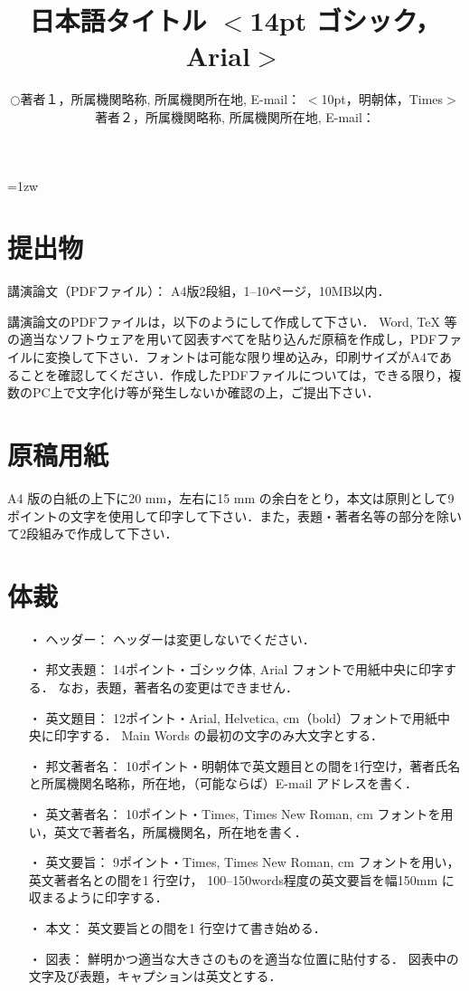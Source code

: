 \documentclass[a4j]{jarticle}
\title{日本語タイトル $<$14pt ゴシック，Arial$>$}   %
\author{\begin{tabular}{cl}
$\bigcirc$ & 著者１，所属機関略称, 
             所属機関所在地, 
             E-mail：
             $<$10pt，明朝体，Times$>$ \\
           & 著者２，所属機関略称,
             所属機関所在地, 
             E-mail：
\end{tabular} }
\begin{document}
\baselineskip=1zw
\maketitle

\section{提出物}

\vspace*{2mm}
講演論文（PDFファイル）： A4版2段組，1--10ページ，10MB以内．
\vspace*{2mm}

講演論文のPDFファイルは，以下のようにして作成して下さい． Word, TeX 等の適当なソフトウェアを用いて図表すべてを貼り込んだ原稿を作成し，PDFファイルに変換して下さい．フォントは可能な限り埋め込み，印刷サイズがA4であることを確認してください．作成したPDFファイルについては，できる限り，複数のPC上で文字化け等が発生しないか確認の上，ご提出下さい．


\section{原稿用紙}

A4 版の白紙の上下に20 mm，左右に15 mm の余白をとり，本文は原則として9ポイントの文字を使用して印字して下さい．また，表題・著者名等の部分を除いて2段組みで作成して下さい．


\section{体裁} %

\begin{enumerate}
    \item[・] ヘッダー：
        ヘッダーは変更しないでください．
    \item[・] 邦文表題：
        14ポイント・ゴシック体, Arial フォントで用紙中央に印字する．
        なお，表題，著者名の変更はできません．
    \item[・] 英文題目：
        12ポイント・Arial, Helvetica, cm（bold）フォントで用紙中央に印字する．
        Main Words の最初の文字のみ大文字とする．
    \item[・] 邦文著者名：
        10ポイント・明朝体で英文題目との間を1行空け，著者氏名と所属機関名略称，所在地，（可能ならば）E-mail アドレスを書く．
    \item[・] 英文著者名：
        10ポイント・Times, Times New Roman, cm フォントを用い，英文で著者名，所属機関名，所在地を書く．
    \item[・] 英文要旨：
        9ポイント・Times, Times New Roman, cm フォントを用い，英文著者名との間を1 行空け，
        100--150words程度の英文要旨を幅150mm に収まるように印字する．
    \item[・] 本文：
        英文要旨との間を1 行空けて書き始める．
    \item[・] 図表：
        鮮明かつ適当な大きさのものを適当な位置に貼付する．
        図表中の文字及び表題，キャプションは英文とする．
\end{enumerate}
\end{document}
